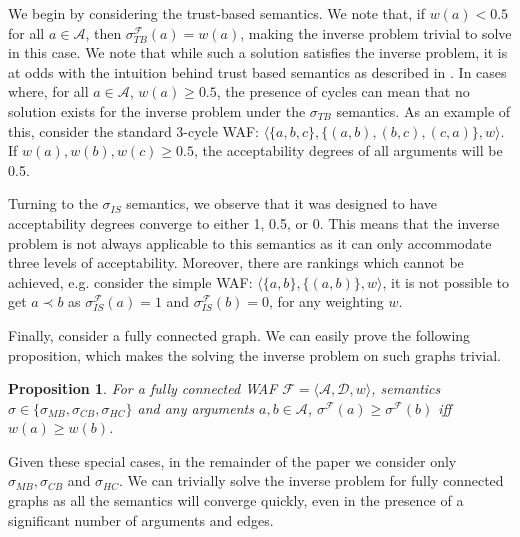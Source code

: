 \documentclass{article}
\newcommand{\AF}{\mathcal{F}}
\newcommand{\A}{\mathcal{A}}
\newcommand{\D}{\mathcal{D}}
\newtheorem{proposition}{Proposition}
\begin{document}
We begin by considering the trust-based semantics. We note that, if $w(a)<0.5$ for all $a \in \A$, then $\sigma_{TB}^\AF(a)=w(a)$, making the inverse problem trivial to solve in this case.
%
We note that while such a solution satisfies the inverse problem, it is at odds with the intuition behind trust based semantics as described in \cite{TB-sem}. %
In cases where, for all $a\in \A$, $w(a) \geq 0.5$, the presence of cycles can mean that no solution exists for the inverse problem under the $\sigma_{TB}$ semantics. As an example of this, consider the standard 3-cycle WAF: $\langle \{a,b,c\},\{(a,b),(b,c),(c,a)\},w \rangle$. If $w(a),w(b),w(c) \geq 0.5$, the acceptability degrees of all arguments will be 0.5.

Turning to the $\sigma_{IS}$ semantics, we observe that it was designed to have acceptability degrees converge to either 1, 0.5, or 0. This means that the inverse problem is not always applicable to this semantics as it can only accommodate three levels of acceptability. Moreover, there are rankings which cannot be achieved, e.g. consider the simple WAF: $\langle \{a,b\}, \{ (a,b)\}, w \rangle$, it is not possible to get $a \prec b$ as $\sigma_{IS}^\AF(a) = 1$ and $\sigma_{IS}^\AF(b) = 0$, for any weighting $w$.
%

Finally, consider a fully connected graph. We can easily prove the following proposition, which makes the solving the inverse problem on such graphs trivial.

\begin{proposition}
\label{prop:fully-connected}
For a fully connected WAF $\AF=\langle \A, \D, w \rangle$, semantics $\sigma \in \{\sigma_{MB}, \sigma_{CB}, \sigma_{HC}\}$ and any arguments $a,b \in \A$, $\sigma^\AF(a) \geq \sigma^{\AF}(b)$ iff $w(a) \geq w(b)$.
\end{proposition}

Given these special cases, in the remainder of the paper we consider only $\sigma_{MB}, \sigma_{CB}$ and $\sigma_{HC}$. We can trivially solve the inverse problem for fully connected graphs as all the semantics will converge quickly, even in the presence of a significant number of arguments and edges.
\end{document}
